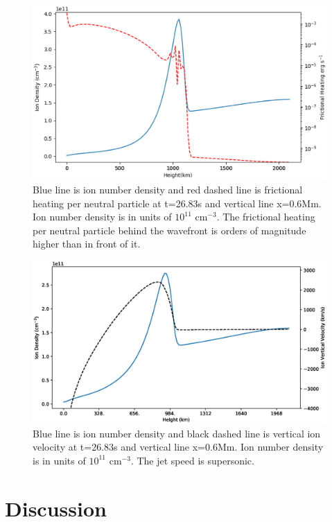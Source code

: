 \documentclass[12pt,upcase]{umlthesis}
\begin{document}
\begin{figure}[ht!]
	\centering
    \includegraphics[width=1\textwidth]{images/spiculefriction1d.eps}
    \caption{Blue line is ion number density and red dashed line is frictional heating per neutral particle at t=26.83s and vertical line x=0.6Mm. Ion number density is in units of $10^{11}$ cm$^{-3}$. The frictional heating per neutral particle behind the wavefront is orders of magnitude higher than in front of it.}\label{fig:spiculefriction1d}
\end{figure}

\begin{figure}[ht!]
	\centering
    \includegraphics[width=1\textwidth]{images/spiculespeed1d.eps}
    \caption{Blue line is ion number density and black dashed line is vertical ion velocity at t=26.83s and vertical line x=0.6Mm. Ion number density is in units of $10^{11}$ cm$^{-3}$. The jet speed is supersonic.}\label{fig:spiculespeed1d}
\end{figure}

\section{Discussion}\label{sec:discussion}
\end{document}
